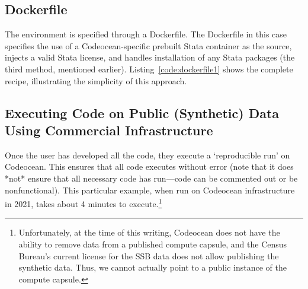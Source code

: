 \documentclass[inline]{hdsr}
\begin{document}








\subsection{Dockerfile}

The environment is specified through a Dockerfile. The Dockerfile in this case specifies the use of a Codeocean-specific prebuilt Stata container as the source, injects a valid Stata license, and handles installation of any Stata packages (the third method, mentioned earlier). Listing~\ref{code:dockerfile1} shows the complete recipe, illustrating the simplicity of this approach. 



\subsection{Executing Code on Public (Synthetic) Data Using Commercial Infrastructure}

Once the user has developed all the code, they execute a `reproducible run' on Codeocean. This ensures that all code executes without error (note that it does *not* ensure that all necessary code has run---code can be commented out or be nonfunctional). This particular example, when run on Codeocean infrastructure in 2021, takes about 4 minutes to execute.\footnote{Unfortunately, at the time of this writing, Codeocean does not have the ability to remove data from a published compute capsule, and the Census Bureau's current license for the SSB data does not allow publishing the synthetic data. Thus, we cannot actually point to a public instance of the compute capsule.}
\end{document}
